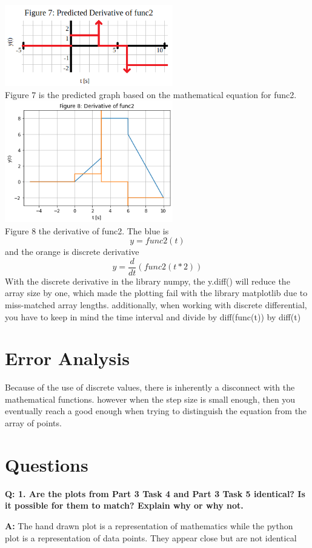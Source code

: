 \documentclass[12pt,a4paper]{article}
\newcommand{\Q}{\bigskip\bfseries Q: }
\newcommand{\A}{\par\textbf{A:} \normalfont}
\begin{document}
\includegraphics[width=0.55\textwidth]{Figure7.png}\\
Figure 7 is the predicted graph based on the mathematical equation for func2.\\

\includegraphics[width=0.55\textwidth]{Figure8.png}~\\
Figure 8 the derivative of func2. The blue is \[y = func2(t)\] and the orange is discrete derivative \[y =  \frac{d}{dt}( {func2(t*2)})\]
With the discrete derivative in the library numpy, the y.diff() will reduce the array size by one, which made the plotting fail with the library matplotlib due to miss-matched array lengths.  additionally, when working with discrete differential, you have to keep in mind the time interval and divide by diff(func(t)) by diff(t)

\section{Error Analysis}\label{sec:res}
Because of the use of discrete values, there is inherently a disconnect with the mathematical functions.  however when the step size is small enough, then you eventually reach a good enough when trying to distinguish the equation from the array of points.

\section{Questions}\label{sec:res}

\Q 1. Are the plots from Part 3 Task 4 and Part 3 Task 5 identical? Is it possible for them to match? Explain why or why not.
\A The hand drawn plot is a representation of mathematics while the python plot is a representation of data points. They appear close but are not identical
\end{document}
